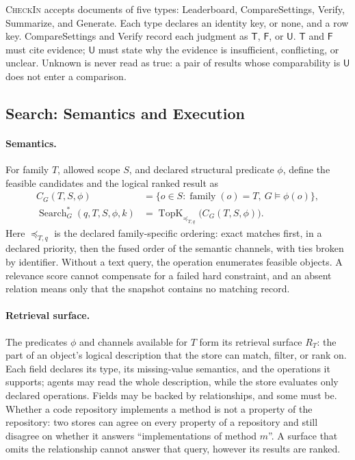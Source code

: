\documentclass[sigconf,review,anonymous]{acmart}
\begin{document}
\textsc{CheckIn} accepts documents of five types: Leaderboard,
CompareSettings, Verify, Summarize, and Generate. Each type declares an
identity key, or none, and a row key. CompareSettings and Verify record each
judgment as $\mathsf T$, $\mathsf F$, or $\mathsf U$. $\mathsf T$ and $\mathsf F$
must cite evidence; $\mathsf U$ must state why the evidence is insufficient,
conflicting, or unclear. Unknown is never read as true: a pair of results whose
comparability is $\mathsf U$ does not enter a comparison.

\subsection{Search: Semantics and Execution}
\label{sec:search-draft}

\paragraph{Semantics.}
For family $T$, allowed scope $S$, and declared structural predicate $\phi$,
define the feasible candidates and the logical ranked result as
\begin{equation}
\label{eq:constrained-retrieval}
\begin{aligned}
C_G(T,S,\phi)
  &= \{o\in S : \operatorname{family}(o)=T,\ G\models\phi(o)\},\\
\operatorname{Search}^{*}_G(q,T,S,\phi,k)
  &= \operatorname{TopK}_{\preceq_{T,q}}\bigl(C_G(T,S,\phi)\bigr).
\end{aligned}
\end{equation}
Here $\preceq_{T,q}$ is the declared family-specific ordering: exact matches
first, in a declared priority, then the fused order of the semantic channels,
with ties broken by identifier. Without a text query, the operation enumerates
feasible objects. A relevance score cannot compensate for a failed hard
constraint, and an absent relation means only that the snapshot contains no
matching record.

\paragraph{Retrieval surface.}
The predicates $\phi$ and channels available for $T$ form its retrieval
surface $R_T$: the part of an object's logical description that the store can
match, filter, or rank on. Each field declares its type, its missing-value
semantics, and the operations it supports; agents may read the whole
description, while the store evaluates only declared operations. Fields may be
backed by relationships, and some must be. Whether a code repository
implements a method is not a property of the repository: two stores can agree
on every property of a repository and still disagree on whether it answers
``implementations of method $m$''. A surface that omits the relationship
cannot answer that query, however its results are ranked.
\end{document}
